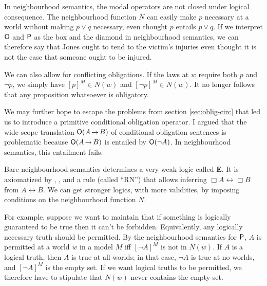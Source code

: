 In neighbourhood semantics, the modal operators are not closed under logical
consequence. The neighbourhood function $N$ can easily make $p$ necessary at a
world without making $p\lor q$ necessary, even thought $p$ entails $p \lor q$.
If we interpret $\operatorname{\mathsf{O}}$ and $\operatorname{\mathsf{P}}$ as the box and the diamond in neighbourhood
semantics, we can therefore say that Jones ought to tend to the victim's
injuries even thought it is not the case that someone ought to be injured.


We can also allow for conflicting obligations. If the laws at $w$ require both
$p$ and $\neg p$, we simply have $[p]^M \in N(w)$ and $[\neg p]^M \in N(w)$. It
no longer follows that any proposition whatsoever is obligatory.

We may further hope to escape the problems from section \ref{sec:oblig-circ}
that led us to introduce a primitive conditional obligation operator. I argued
that the wide-scope translation $\Ob(A \to B)$ of conditional obligation
sentences is problematic because $\Ob(A \to B)$ is entailed by $\operatorname{\mathsf{O}}(\neg A)$. In
neighbourhood semantics, this entailment fails. 

Bare neighbourhood semantics determines a very weak logic called \textbf{E}. It
is axiomatized by , , and a rule (called ``RN'') that allows
inferring $\Box A \leftrightarrow \Box B$ from $A \leftrightarrow B$. We can get
stronger logics, with more validities, by imposing conditions on the
neighbourhood function $N$.

For example, suppose we want to maintain that if something is logically
guaranteed to be true then it can't be forbidden. Equivalently, any logically
necessary truth should be permitted. By the neighbourhood semantics for $\operatorname{\mathsf{P}}$,
$A$ is permitted at a world $w$ in a model $M$ iff $[\neg A]^M$ is not in
$N(w)$. If $A$ is a logical truth, then $A$ is true at all worlds; in that case,
$\neg A$ is true at no worlds, and $[\neg A]^M$ is the empty set. If we want
logical truths to be permitted, we therefore have to stipulate that $N(w)$
never contains the empty set.

